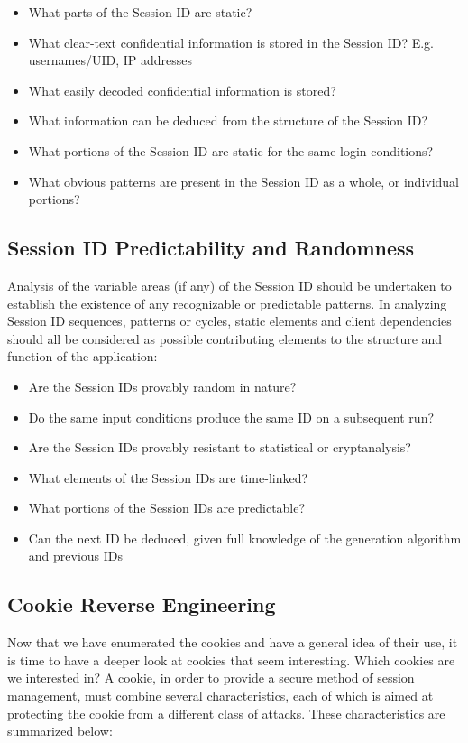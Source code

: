 				\begin{itemize}
					\item What parts of the Session ID are static?
					\item What clear-text confidential information is stored in the Session ID? 
					E.g. usernames/UID, IP addresses
					\item What easily decoded confidential information is stored?
					\item What information can be deduced from the structure of the Session ID?
					\item What portions of the Session ID are static for the same login conditions?
					\item What obvious patterns are present in the Session ID as a whole, or individual
					portions?
				\end{itemize}

		\subsection{Session ID Predictability and Randomness}
			Analysis of the variable areas (if any) of the Session ID should be undertaken to 
			establish the existence of any recognizable or predictable patterns. 
			In analyzing Session ID sequences, patterns or cycles, static elements and client 
			dependencies should all be considered as possible contributing elements to the structure 
			and function of the application:
				\begin{itemize}
					\item Are the Session IDs provably random in nature?
					\item Do the same input conditions produce the same ID on a subsequent run?
					\item Are the Session IDs provably resistant to statistical or cryptanalysis?
					\item What elements of the Session IDs are time-linked?
					\item What portions of the Session IDs are predictable?
					\item Can the next ID be deduced, given full knowledge of the generation algorithm 
					and previous IDs
				\end{itemize}

		\subsection{Cookie Reverse Engineering}
			Now that we have enumerated the cookies and have a general idea of their use, it is time to 
			have a deeper look at cookies that seem interesting. Which cookies are we interested in? 
			A cookie, in order to provide a secure method of session management, must combine several
			characteristics, each of which is aimed at protecting the cookie from a different class 
			of attacks. These characteristics are summarized below:

